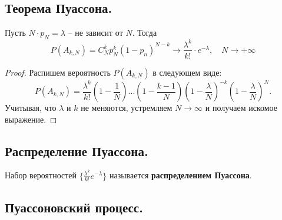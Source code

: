 \subsection{Теорема Пуассона.}
\begin{theorem}
    Пусть $N \cdot p_N = \lambda$ -- не зависит от $N$. Тогда
    \[
        P(A_{k, N}) = C_N^k p_N^k (1 - p_n)^{N - k} \to \frac{\lambda^k}{k!} \cdot e^{-\lambda},
        \quad
        N \to +\infty
    \]
    \begin{proof}
        Распишем вероятность $P(A_{k, N})$ в следующем виде:
        \[
            P(A_{k, N}) = \frac{\lambda^k}{k!}
            \left( 1 - \frac{1}{N} \right)
            ...
            \left( 1 - \frac{k-1}{N} \right)
            \left( 1 - \frac{\lambda}{N} \right)^{-k}
            \left( 1 - \frac{\lambda}{N} \right)^{N}.
        \]
        Учитывая, что $\lambda$ и $k$ не меняются, устремляем $N \to \infty$ и получаем искомое выражение.
    \end{proof}
\end{theorem}

\subsection{Распределение Пуассона.}
\begin{definition}
    Набор вероятностей $\{ \frac{\lambda^k}{k!} e^{-\lambda} \}$ называется \textbf{распределением Пуассона}.
\end{definition}

\subsection{Пуассоновский процесс.}